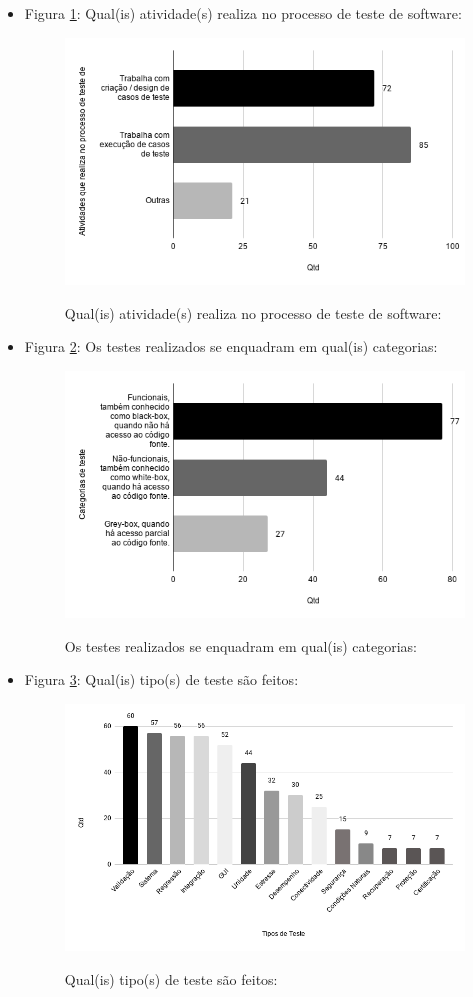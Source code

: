 \begin{itemize}
    
    \item Figura \ref{figure:s_atividadesprojeto}: Qual(is) atividade(s) realiza no processo de teste de software:
    \begin{figure}[!htb]
    \centering
    \includegraphics[width=.55\textwidth]{images/s_atividadesprojeto.png}
    \label{figure:s_atividadesprojeto}
    \caption{Qual(is) atividade(s) realiza no processo de teste de software:}
    \end{figure}   
    
    
    \item Figura \ref{figure:s_categoriastestes}: Os testes realizados se enquadram em qual(is) categorias:
    \begin{figure}[!htb]
    \centering
    \includegraphics[width=.55\textwidth]{images/s_categoriastestes.png}
    \label{figure:s_categoriastestes}
    \caption{Os testes realizados se enquadram em qual(is) categorias:}
    \end{figure}       
    
  
     \item Figura \ref{figure:s_tipostestes}: Qual(is) tipo(s) de teste são feitos:
    \begin{figure}[!htb]
    \centering
    \includegraphics[width=.55\textwidth]{images/s_tipostestes.png}
    \label{figure:s_tipostestes}
    \caption{Qual(is) tipo(s) de teste são feitos:}
    \end{figure}
    

\end{itemize}
